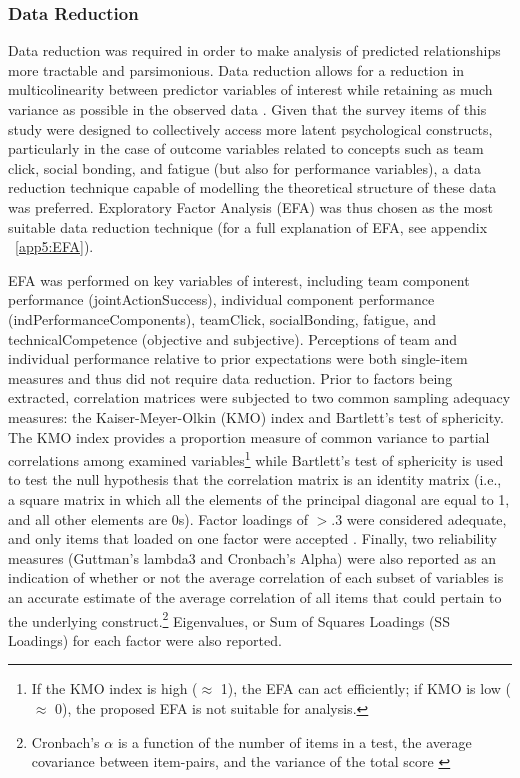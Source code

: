 \subsubsection{Data Reduction} \label{subsection:dataReduction}
Data reduction was required in order to make analysis of predicted relationships more tractable and parsimonious. Data reduction allows for a reduction in multicolinearity between predictor variables of interest while retaining as much variance as possible in the observed data \citep{Yong2013}.  Given that the survey items of this study were designed to collectively access more latent psychological constructs, particularly in the case of outcome variables related to concepts such as team click, social bonding, and fatigue (but also for performance variables), a data reduction technique capable of modelling the theoretical structure of these data was preferred.  Exploratory Factor Analysis (EFA) was thus chosen as the most suitable data reduction technique (for a full explanation of EFA, see appendix ~\ref{app5:EFA}).

EFA was performed on key variables of interest, including team component performance (jointActionSuccess), individual component performance (indPerformanceComponents), teamClick, socialBonding, fatigue, and technicalCompetence (objective and subjective). Perceptions of team and individual performance relative to prior expectations were both single-item measures and thus did not require data reduction.  Prior to factors being extracted, correlation matrices were subjected to two common sampling adequacy measures: the Kaiser-Meyer-Olkin (KMO) index and Bartlett’s test of sphericity. The KMO index provides a proportion measure of common variance to partial correlations among examined variables\footnote{If the KMO index is high ($\approx$ 1), the EFA can act efficiently; if KMO is low ($\approx$ 0), the proposed EFA is not suitable for analysis.} while Bartlett’s test of sphericity is used to test the null hypothesis that the correlation matrix is an identity matrix (i.e., a square matrix in which all the elements of the principal diagonal are equal to 1, and all other elements are 0s). Factor loadings of $> .3$ were considered adequate, and only items that loaded on one factor were accepted \citep{Field2012}. Finally, two reliability measures (Guttman's lambda3 and Cronbach's Alpha) were also reported as an indication of whether or not the average correlation of each subset of variables is an accurate estimate of the average correlation of all items that could pertain to the underlying construct.\footnote{Cronbach's $\alpha$ is a function of the number of items in a test, the average covariance between item-pairs, and the variance of the total score \citep{Tabachnick2007}} Eigenvalues, or Sum of Squares Loadings (SS Loadings) for each factor were also reported\citep{Dziuban1974}.

